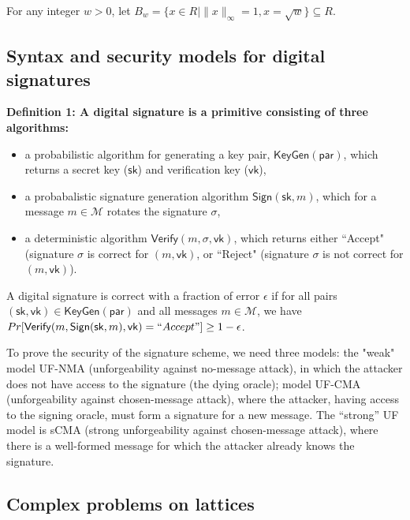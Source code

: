 \documentclass{article}
\theoremstyle{plain}
\theoremstyle{definition}
\begin{document}
    For any integer $w>0$, let $B_w = \{ x \in R | \|x\|_\infty = 1, x = \sqrt{w}\} \subseteq R$.

    \subsection{Syntax and security models for digital signatures}
    \label{sec:syntax_and_security}

    \textbf{Definition 1: A digital signature is a primitive consisting of three algorithms:}

    \begin{itemize}
        \item a probabilistic algorithm for generating a key pair, $\mathsf{KeyGen}(\mathsf{par})$, which returns a secret key ($\mathsf{sk}$) and verification key ($\mathsf{vk}$),
        \item a probabalistic signature generation algorithm $\mathsf{Sign}(\mathsf{sk}, m)$, which for a message $m \in\mathcal{M}$    rotates the signature $\sigma$,
        \item a deterministic algorithm $\mathsf{Verify}(m, \sigma, \mathsf{vk})$, which returns either ``Accept" (signature $\sigma$ is correct for $(m, \mathsf{vk})$, or ``Reject" (signature $\sigma$ is not correct for $(m, \mathsf{vk})$).
    \end{itemize}
    
    A digital signature is correct with a fraction of error $\epsilon$ if for all pairs $(\mathsf{sk}, \mathsf{vk}) \in \mathsf{KeyGen}(\mathsf{par})$ and all messages $m \in \mathcal{M}$, we have $Pr[\mathsf{Verify} (m, \mathsf{Sign}(\mathsf{sk}, m), \mathsf{vk}) = ``Accept"] \geq 1 - \epsilon$.

    To prove the security of the signature scheme, we need three models: the "weak" model UF-NMA (unforgeability against no-message attack), in which the attacker does not have access to the signature (the dying oracle); model UF-CMA (unforgeability against chosen-message attack), where the attacker, having access to the signing oracle, must form a signature for a new message. The “strong” UF model is sCMA (strong unforgeability against chosen-message attack), where there is a well-formed message for which the attacker already knows the signature.

    \subsection{Complex problems on lattices}
    \label{complex_problems}
\end{document}
